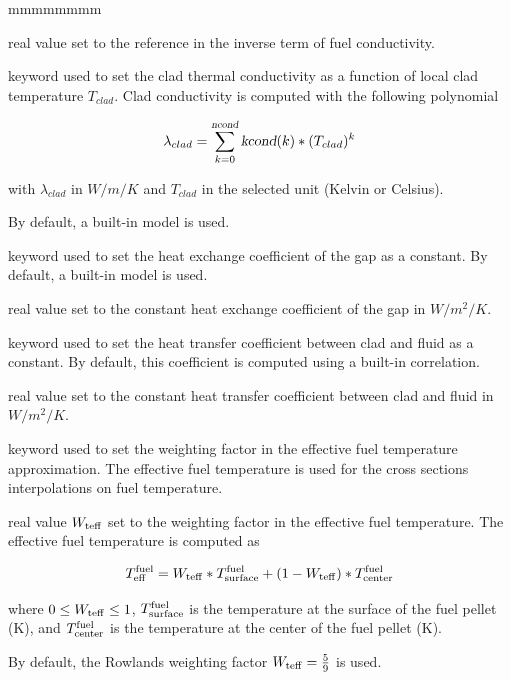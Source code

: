 \begin{ListeDeDescription}{mmmmmmmm}
\item[\dusa{ref}] real value set to the reference in the inverse term of fuel conductivity.

\item[\moc{CONDC}] keyword used to set the clad thermal conductivity as a function of local clad temperature $T_{clad}$.
Clad conductivity is computed with the following polynomial

$$\lambda_{clad} = \sum_{k=0}^{\dusa{ncond}} {\dusa{kcond}(k)*(T_{clad})^k}$$

with $\lambda_{clad}$ in $W/m/K$ and $T_{clad}$ in the selected unit (Kelvin or Celsius).

By default, a built-in model is used.

\item[\moc{HGAP}] keyword used to set the heat exchange coefficient of the gap as a constant.
By default, a built-in model is used.

\item[\dusa{hgap}] real value set to the constant heat exchange coefficient of the gap in $W/m^2/K$.

\item[\moc{HCONV}] keyword used to set the heat transfer coefficient between clad and fluid as a constant.
By default, this coefficient is computed using a built-in correlation.

\item[\dusa{hconv}] real value set to the constant heat transfer coefficient between clad and fluid in $W/m^2/K$.

\item[\moc{TEFF}] keyword used to set the weighting factor in the effective fuel temperature approximation.
The effective fuel temperature is used for the cross sections interpolations on fuel temperature.

\item[\dusa{wteff}] real value $W_{\rm teff}$ set to the weighting factor in the effective fuel temperature.
The effective fuel temperature is computed as

$$
T^{\rm fuel}_{\rm eff}=W_{\rm teff}*T^{\rm fuel}_{\rm surface}+(1-W_{\rm teff})*T^{\rm fuel}_{\rm center}
$$

where $0\le W_{\rm teff} \le 1$, $T^{\rm fuel}_{\rm surface}$ is the temperature at the surface of the fuel pellet (K), and $T^{\rm fuel}_{\rm center}$ is the temperature at the center of the fuel pellet (K).

By default, the Rowlands weighting factor $W_{\rm teff}={5 \over 9}$ is used\cite{Rowlands}.


\end{ListeDeDescription}
